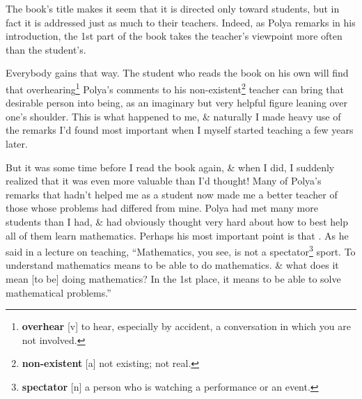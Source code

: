 \documentclass[oneside]{book}
\numberwithin{equation}{section}
\begin{document}
The book's title makes it seem that it is directed only toward students, but in fact it is addressed just as much to their teachers. Indeed, as Polya remarks in his introduction, the 1st part of the book takes the teacher's viewpoint more often than the student's.

Everybody gains that way. The student who reads the book on his own will find that overhearing\footnote{\textbf{overhear} [v] to hear, especially by accident, a conversation in which you are not involved.} Polya's comments to his non-existent\footnote{\textbf{non-existent} [a] not existing; not real.} teacher can bring that desirable person into being, as an imaginary but very helpful figure leaning over one's shoulder. This is what happened to me, \& naturally I made heavy use of the remarks I'd found most important when I myself started teaching a few years later.

But it was some time before I read the book again, \& when I did, I suddenly realized that it was even more valuable than I'd thought! Many of Polya's remarks that hadn't helped me as a student now made me a better teacher of those whose problems had differed from mine. Polya had met many more students than I had, \& had obviously thought very hard about how to best help all of them learn mathematics. Perhaps his most important point is that . As he said in a lecture on teaching, ``Mathematics, you see, is not a spectator\footnote{\textbf{spectator} [n] a person who is watching a performance or an event.} sport. To understand mathematics means to be able to do mathematics. \& what does it mean [to be] doing mathematics? In the 1st place, it means to be able to solve mathematical problems.''
\end{document}

